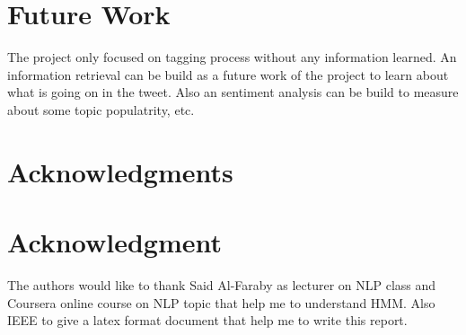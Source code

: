 \documentclass[conference,compsoc]{IEEEtran}
\begin{document}
\section{Future Work}
The project only focused on tagging process without any information learned. An information retrieval can be build as a future work of the project to learn about what is going on in the tweet. Also an sentiment analysis can be build to measure about some topic populatrity, etc.






\ifCLASSOPTIONcompsoc
  \section{Acknowledgments}
\else
  \section{Acknowledgment}
\fi


The authors would like to thank Said Al-Faraby as lecturer on NLP class and Coursera online course on NLP topic that help me to understand HMM. Also IEEE to give a latex format document that help me to write this report\cite{IEEEhowto:kopka}.






\end{document}
